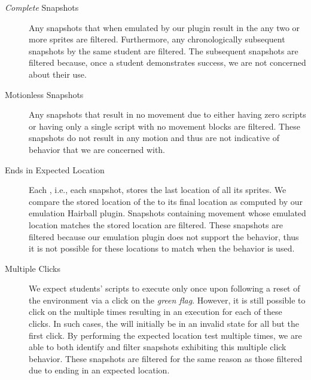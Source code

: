 \begin{description}
\item [\emph{Complete} Snapshots] Any snapshots that when emulated by our
  plugin result in the \net{}  any two or more sprites are
  filtered. Furthermore, any chronologically subsequent snapshots by the same
  student are filtered. The subsequent snapshots are filtered because, once a
  student demonstrates success, we are not concerned about their \dce{} use.
\item [Motionless Snapshots] Any snapshots that result in no movement due to
  either having zero scripts or having only a single \netclicked{} script with
  no movement blocks are filtered. These snapshots do not result in any motion
  and thus are not indicative of \dce{} behavior that we are concerned with.
\item [\net{} Ends in Expected Location] Each \sprogram{}, i.e., each snapshot,
  stores the last location of all its sprites. We compare the stored location
  of the \net{} to its final location as computed by our \net{} emulation
  Hairball plugin. Snapshots containing movement whose emulated \net{} location
  matches the  stored location are filtered. These snapshots are
  filtered because our emulation plugin does not support the \dce{} behavior,
  thus it is not possible for these locations to match when the \dce{} behavior
  is used.
\item [Multiple \net{} Clicks] We expect students' scripts to execute only once
  upon \netclicked{} following a reset of the environment via a click on the
  \emph{green flag}. However, it is still possible to click on the \net{}
  multiple times resulting in an execution for each of these clicks. In such
  cases, the \net{} will initially be in an invalid state for all but the first
  \net{} click. By performing the expected location test multiple times, we are
  able to both identify and filter snapshots exhibiting this multiple \net{}
  click behavior. These snapshots are filtered for the same reason as those
  filtered due to ending in an expected location.
\end{description}

